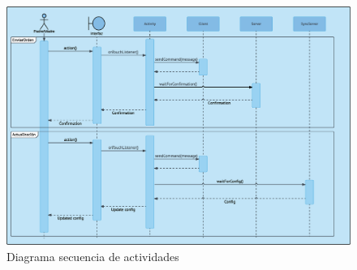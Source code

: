\documentclass[12pt, twoside]{article}
\begin{document}
    \begin{figure}[h!]
    \centering
        \includegraphics[scale=0.32]{main_activity_sequence_diagram.eps}
        \caption{Diagrama secuencia de actividades}
        \label{fig:main_activity_sequence_diagram}
    \end{figure}
\end{document}
